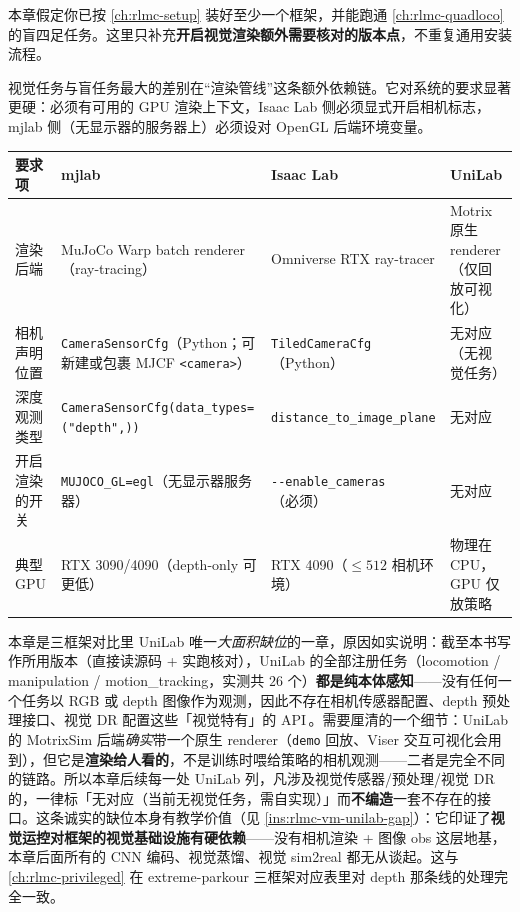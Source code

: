 本章假定你已按 \cref{ch:rlmc-setup} 装好至少一个框架，并能跑通 \cref{ch:rlmc-quadloco} 的盲四足任务。这里只补充\textbf{开启视觉渲染额外需要核对的版本点}，不重复通用安装流程。

视觉任务与盲任务最大的差别在“渲染管线”这条额外依赖链。它对系统的要求显著更硬：必须有可用的 GPU 渲染上下文，Isaac Lab 侧必须显式开启相机标志，mjlab 侧（无显示器的服务器上）必须设对 OpenGL 后端环境变量。

\begin{center}
\small
\begin{tabular}{@{}llll@{}}
\toprule
要求项 & mjlab & Isaac Lab & UniLab \\
\midrule
渲染后端 & MuJoCo Warp batch renderer（ray-tracing） & Omniverse RTX ray-tracer & Motrix 原生 renderer（仅回放可视化） \\
相机声明位置 & \verb|CameraSensorCfg|（Python；可新建或包裹 MJCF \verb|<camera>|） & \verb|TiledCameraCfg|（Python） & 无对应（无视觉任务） \\
深度观测类型 & \verb|CameraSensorCfg(data_types=("depth",))| & \verb|distance_to_image_plane| & 无对应 \\
开启渲染的开关 & \verb|MUJOCO_GL=egl|（无显示器服务器） & \verb|--enable_cameras|（必须） & 无对应 \\
典型 GPU & RTX 3090/4090（depth-only 可更低） & RTX 4090（$\le 512$ 相机环境） & 物理在 CPU，GPU 仅放策略 \\
\bottomrule
\end{tabular}
\end{center}

\begin{note}
本章是三框架对比里 UniLab 唯一\emph{大面积缺位}的一章，原因如实说明：截至本书写作所用版本（直接读源码 + 实跑核对），UniLab 的全部注册任务（locomotion / manipulation / motion\_tracking，实测共 $26$ 个）\textbf{都是纯本体感知}——没有任何一个任务以 RGB 或 depth 图像作为观测，因此不存在相机传感器配置、depth 预处理接口、视觉 DR 配置这些「视觉特有」的 API\,\cite{unilab2026}。需要厘清的一个细节：UniLab 的 MotrixSim 后端\emph{确实}带一个原生 renderer（\verb|demo| 回放、Viser 交互可视化会用到），但它是\textbf{渲染给人看的}，不是训练时喂给策略的相机观测——二者是完全不同的链路。所以本章后续每一处 UniLab 列，凡涉及视觉传感器/预处理/视觉 DR 的，一律标「无对应（当前无视觉任务，需自实现）」而\textbf{不编造}一套不存在的接口。这条诚实的缺位本身有教学价值（见 \cref{ins:rlmc-vm-unilab-gap}）：它印证了\textbf{视觉运控对框架的视觉基础设施有硬依赖}——没有相机渲染 + 图像 obs 这层地基，本章后面所有的 CNN 编码、视觉蒸馏、视觉 sim2real 都无从谈起。这与 \cref{ch:rlmc-privileged} 在 extreme-parkour 三框架对应表里对 depth 那条线的处理完全一致。
\end{note}

